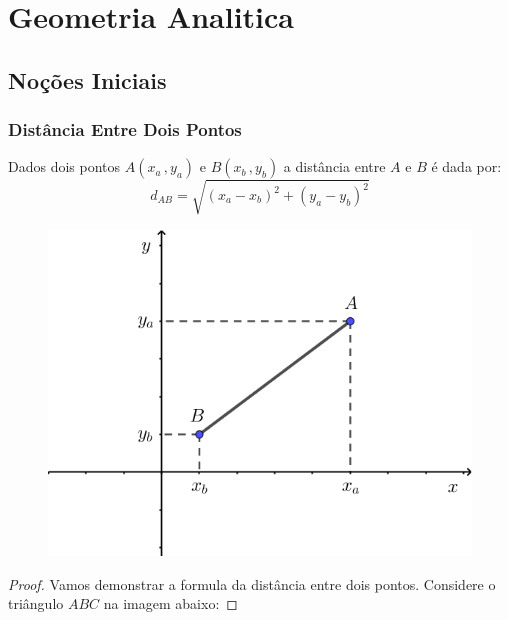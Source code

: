 \chapter{Geometria Analitica}

\section{Noções Iniciais}
\subsection{Distância Entre Dois Pontos}

Dados dois pontos $A(x_a\, , y_a)$ e $B(x_b\, , y_b)$ a distância entre $A$ e $B$ é dada por:
$$d_{AB} = \sqrt{(x_a - x_b)^2 + (y_a - y_b)^2}$$


\begin{figure}[H]
	\centering
	
	\includegraphics[scale=3.5]{imagens/distanciaab.png}

\end{figure}

\newtheorem{proof}{Demonstração}
\begin{proof}
Vamos demonstrar a formula da distância entre dois pontos.
Considere o triângulo $ABC$ na imagem abaixo:
\end{proof}

